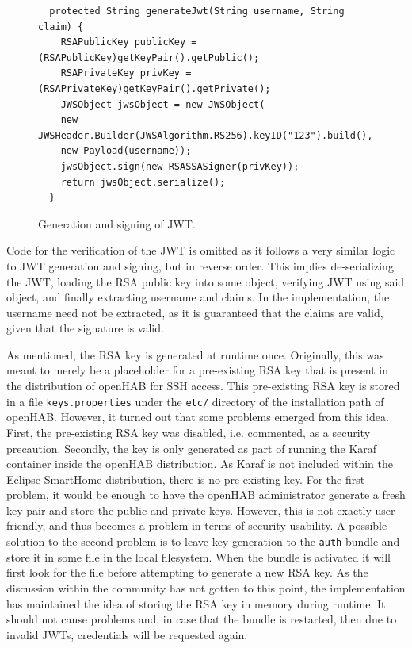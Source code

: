 \documentclass[12pt]{article}
\begin{document}
\begin{figure} [htb]
\begin{lstlisting}
  protected String generateJwt(String username, String claim) {
    RSAPublicKey publicKey = (RSAPublicKey)getKeyPair().getPublic();
    RSAPrivateKey privKey = (RSAPrivateKey)getKeyPair().getPrivate();
    JWSObject jwsObject = new JWSObject(
    new JWSHeader.Builder(JWSAlgorithm.RS256).keyID("123").build(),
    new Payload(username));
    jwsObject.sign(new RSASSASigner(privKey));
    return jwsObject.serialize();	
  }    
\end{lstlisting}
\caption{Generation and signing of JWT.}
\label{lst:rsa}
\end{figure}

Code for the verification of the JWT is omitted as it follows a very similar logic to JWT generation and signing, but in reverse order. This implies de-serializing the JWT, loading the RSA public key into some object, verifying JWT using said object, and finally extracting username and claims. In the implementation, the username need not be extracted, as it is guaranteed that the claims are valid, given that the signature is valid.

As mentioned, the RSA key is generated at runtime once. Originally, this was meant to merely be a placeholder for a pre-existing RSA key that is present in the distribution of openHAB for SSH access. This pre-existing RSA key is stored in a file \texttt{keys.properties} under the \texttt{etc/} directory of the installation path of openHAB. However, it turned out that some problems emerged from this idea. First, the pre-existing RSA key was disabled, i.e. commented, as a security precaution. Secondly, the key is only generated as part of running the Karaf container inside the openHAB distribution. As Karaf is not included within the Eclipse SmartHome distribution, there is no pre-existing key. For the first problem, it would be enough to have the openHAB administrator generate a fresh key pair and store the public and private keys. However, this is not exactly user-friendly, and thus becomes a problem in terms of security usability.  A possible solution to the second problem is to leave key generation to the \texttt{auth} bundle and store it in some file in the local filesystem. When the bundle is activated it will first look for the file before attempting to generate a new RSA key. As the discussion within the community has not gotten to this point, the implementation has maintained the idea of storing the RSA key in memory during runtime. It should not cause problems and, in case that the bundle is restarted, then due to invalid JWTs, credentials will be requested again.
\end{document}
